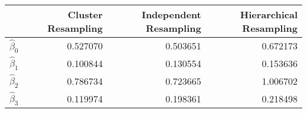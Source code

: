\begin{tabular}{lrrr}
\toprule
{} &  Cluster Resampling &  Independent Resampling &  Hierarchical Resampling \\
\midrule
$\hat\beta_0$ &            0.527070 &                0.503651 &                 0.672173 \\
$\hat\beta_1$ &            0.100844 &                0.130554 &                 0.153636 \\
$\hat\beta_2$ &            0.786734 &                0.723665 &                 1.006702 \\
$\hat\beta_3$ &            0.119974 &                0.198361 &                 0.218498 \\
\bottomrule
\end{tabular}
